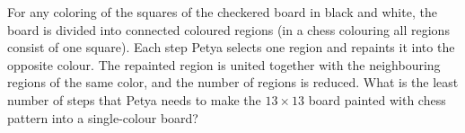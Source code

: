 \problem
For any coloring of the squares of the checkered board in black and white, the board is divided into connected coloured regions (in a chess colouring all regions consist of one square). 
Each step Petya selects one region and repaints it into the opposite colour. 
The repainted region is united together with the neighbouring regions of the same color, and the number of regions is reduced. 
What is the least number of steps that Petya needs to make the $13 \times 13$ board painted with chess pattern into a single-colour board?
\solution
\endproblem
